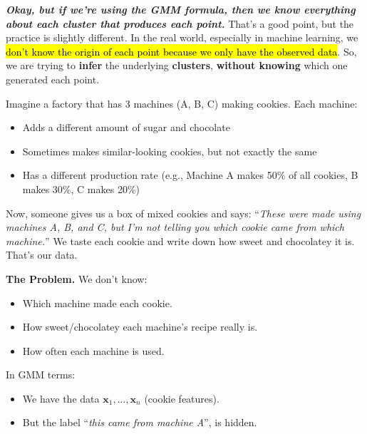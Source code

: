 \highspace
\textcolor{Red2}{\textbf{\emph{Okay, but if we're using the GMM formula, then we know everything about each cluster that produces each point.}}} That's a good point, but the practice is slightly different. In the real world, especially in machine learning, we \hl{don't know the origin of each point because we only have the observed data}. So, we are trying to \textbf{infer} the underlying \textbf{clusters}, \textbf{without knowing} which one generated each point.

\begin{examplebox}\label{example: analogy of the GMM problem}
    Imagine a factory that has 3 machines (A, B, C) making cookies. Each machine:
    \begin{itemize}
        \item Adds a different amount of sugar and chocolate
        \item Sometimes makes similar-looking cookies, but not exactly the same
        \item Has a different production rate (e.g., Machine A makes 50\% of all cookies, B makes 30\%, C makes 20\%)
    \end{itemize}
    Now, someone gives us a box of mixed cookies and says: ``\emph{These were made using machines A, B, and C, but I'm not telling you which cookie came from which machine.}'' We taste each cookie and write down how sweet and chocolatey it is. That's our data.

    \highspace
    \textcolor{Red2}{ \textbf{The Problem.}} We don't know:
    \begin{itemize}
        \item Which machine made each cookie.
        \item How sweet/chocolatey each machine's recipe really is.
        \item How often each machine is used.
    \end{itemize}
    In GMM terms:
    \begin{itemize}
        \item We have the data $\mathbf{x}_{1}, \dots, \mathbf{x}_{n}$ (cookie features).
        \item But the label ``\emph{this came from machine A}'', is hidden.
    \end{itemize}


\end{examplebox}
